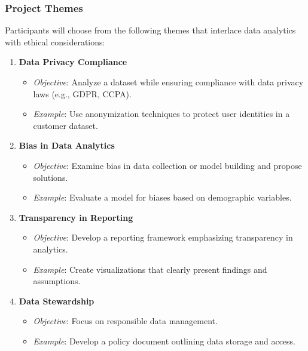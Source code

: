 \documentclass[aspectratio=169]{beamer}
\begin{document}
\begin{frame}[fragile]
    \frametitle{Project Themes}
    Participants will choose from the following themes that interlace data analytics with ethical considerations:
    \begin{enumerate}
        \item \textbf{Data Privacy Compliance}
            \begin{itemize}
                \item \textit{Objective}: Analyze a dataset while ensuring compliance with data privacy laws (e.g., GDPR, CCPA).
                \item \textit{Example}: Use anonymization techniques to protect user identities in a customer dataset.
            \end{itemize}
        
        \item \textbf{Bias in Data Analytics}
            \begin{itemize}
                \item \textit{Objective}: Examine bias in data collection or model building and propose solutions.
                \item \textit{Example}: Evaluate a model for biases based on demographic variables.
            \end{itemize}
        
        \item \textbf{Transparency in Reporting}
            \begin{itemize}
                \item \textit{Objective}: Develop a reporting framework emphasizing transparency in analytics.
                \item \textit{Example}: Create visualizations that clearly present findings and assumptions.
            \end{itemize}

        \item \textbf{Data Stewardship}
            \begin{itemize}
                \item \textit{Objective}: Focus on responsible data management.
                \item \textit{Example}: Develop a policy document outlining data storage and access.
            \end{itemize}
    \end{enumerate}
\end{frame}
\end{document}
